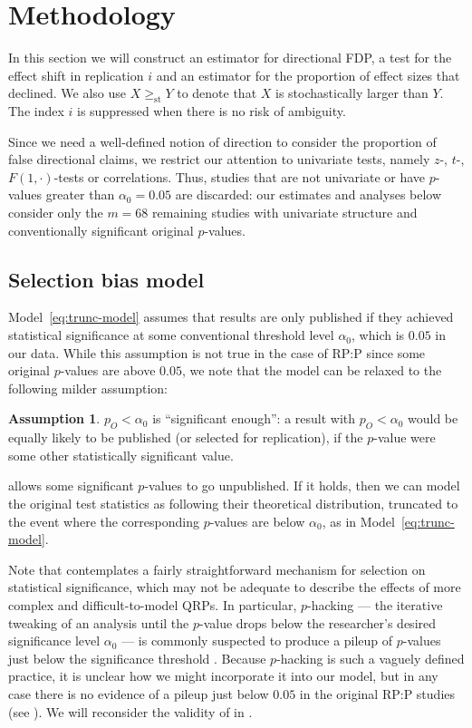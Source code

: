 \documentclass[aoas, preprint]{imsart}
\theoremstyle{definition}
\newtheorem{assumption}{Assumption}
\theoremstyle{custom}
\newcommand{\ao}{\alpha_0}
\newcommand{\gest}{\ge_\text{st}}
\begin{document}
\section{Methodology}
\label{sec:methodology}

  In this section we will construct an estimator for directional FDP, a test for the effect shift in replication $i$ and an estimator for the proportion of effect sizes that declined. We also use $X \gest Y$ to denote that $X$ is stochastically larger than $Y$. The index $i$ is suppressed when there is no risk of ambiguity. 

  Since we need a well-defined notion of direction to consider the proportion of false directional claims, we restrict our attention to univariate tests, namely $z$-, $t$-, $F(1, \cdot)$-tests or correlations. Thus, studies that are not univariate or have $p$-values greater than $\ao = 0.05$ are discarded: our estimates and analyses below consider only the $m = 68$ remaining studies with univariate structure and conventionally significant original $p$-values.

\subsection{Selection bias model}
  Model~\eqref{eq:trunc-model} assumes that results are only published if they achieved statistical significance at some conventional threshold level $\ao$, which is $0.05$ in our data. While this assumption is not true in the case of RP:P since some original $p$-values are above $0.05$, we note that the model can be relaxed to the following milder assumption:
  \begin{assumption}
    \label{ass:sig-enough}
    $p_O < \ao$ is ``significant enough'': a result with $p_O < \ao$ would be equally likely to be published (or selected for replication), if the $p$-value were some other statistically significant value.
  \end{assumption}

   allows some significant $p$-values to go unpublished. If it holds, then we can model the original test statistics as following their theoretical distribution, truncated to the event where the corresponding $p$-values are below $\ao$, as in Model~\ref{eq:trunc-model}.

  Note that  contemplates a fairly straightforward mechanism for selection on statistical significance, which may not be adequate to describe the effects of more complex and difficult-to-model QRPs. In particular, $p$-hacking --- the iterative tweaking of an analysis until the $p$-value drops below the researcher's desired significance level $\ao$ --- is commonly suspected to produce a pileup of $p$-values just below the significance threshold \citep[see e.g.][]{Simonsohn:2014fa}. Because $p$-hacking is such a vaguely defined practice, it is unclear how we might incorporate it into our model, but in any case there is no evidence of a pileup just below $0.05$ in the original RP:P studies (see ). We will reconsider the validity of  in .
\end{document}
